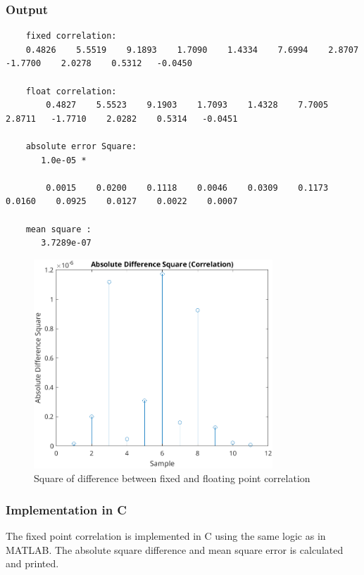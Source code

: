 \documentclass[a4paper,12pt]{article}
\begin{document}
\subsubsection{Output}
\begin{lstlisting}
    fixed correlation:
    0.4826    5.5519    9.1893    1.7090    1.4334    7.6994    2.8707   -1.7700    2.0278    0.5312   -0.0450

    float correlation:
        0.4827    5.5523    9.1903    1.7093    1.4328    7.7005    2.8711   -1.7710    2.0282    0.5314   -0.0451

    absolute error Square:
       1.0e-05 *

        0.0015    0.0200    0.1118    0.0046    0.0309    0.1173    0.0160    0.0925    0.0127    0.0022    0.0007

    mean square : 
       3.7289e-07
\end{lstlisting}

\begin{figure}[h]
    \centering
    \includegraphics[width=0.8\textwidth]{./figs/corr.png}
    \caption{Square of difference between fixed and floating point correlation}
    \label{fig:correlation}
\end{figure}

\newpage

\subsubsection{Implementation in C}
The fixed point correlation is implemented in C using the same logic as in MATLAB.
The absolute square difference and mean square error is calculated and printed.
\end{document}
